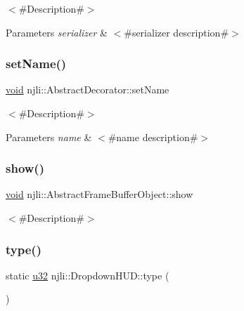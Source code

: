 $<$\#\+Description\#$>$


\begin{DoxyParams}{Parameters}
{\em serializer} & $<$\#serializer description\#$>$ \\
\hline
\end{DoxyParams}
\mbox{\label{classnjli_1_1_dropdown_h_u_d_a087eb5f8d9f51cc476f12f1d10a3cb95}} 
\subsubsection{\texorpdfstring{set\+Name()}{setName()}}
{\footnotesize\ttfamily \mbox{\hyperlink{_thread_8h_af1e856da2e658414cb2456cb6f7ebc66}{void}} njli\+::\+Abstract\+Decorator\+::set\+Name}

$<$\#\+Description\#$>$


\begin{DoxyParams}{Parameters}
{\em name} & $<$\#name description\#$>$ \\
\hline
\end{DoxyParams}
\mbox{\label{classnjli_1_1_dropdown_h_u_d_a73ffd499fceaacd59b518a541ed2133e}} 
\subsubsection{\texorpdfstring{show()}{show()}}
{\footnotesize\ttfamily \mbox{\hyperlink{_thread_8h_af1e856da2e658414cb2456cb6f7ebc66}{void}} njli\+::\+Abstract\+Frame\+Buffer\+Object\+::show}

$<$\#\+Description\#$>$ \mbox{\label{classnjli_1_1_dropdown_h_u_d_a16c5e70d8b3d9e0f28591c6e82c83483}} 
\subsubsection{\texorpdfstring{type()}{type()}}
{\footnotesize\ttfamily static \mbox{\hyperlink{_util_8h_a10e94b422ef0c20dcdec20d31a1f5049}{u32}} njli\+::\+Dropdown\+H\+U\+D\+::type (\begin{DoxyParamCaption}{ }\end{DoxyParamCaption})\hspace{0.3cm}{\ttfamily [static]}}

